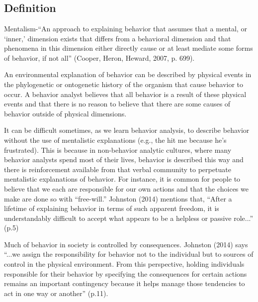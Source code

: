 \clearpage \section[\fourFKSeven{}]{\fourFKSeven{}%
              }
\subsection{Definition}
Mentalism-``An approach to explaining behavior that assumes that a mental, or ‘inner,' dimension exists that differs from a behavioral dimension and that phenomena in this dimension either directly cause or at least mediate some forms of behavior, if not all'' (Cooper, Heron, Heward, 2007, p. 699).

An environmental explanation of behavior can be described by physical events in the phylogenetic or ontogenetic history of the organism that cause behavior to occur. A behavior analyst believes that all behavior is a result of these physical events and that there is no reason to believe that there are some causes of behavior outside of physical dimensions.

It can be difficult sometimes, as we learn behavior analysis, to describe behavior without the use of mentalistic explanations (e.g., the hit me because he's frustrated). This is because in non-behavior analytic cultures, where many behavior analysts spend most of their lives, behavior is described this way and there is reinforcement available from that verbal community to perpetuate mentalistic explanations of behavior. For instance, it is common for people to believe that we each are responsible for our own actions and that the choices we make are done so with ``free-will.''  Johnston (2014) mentions that, ``After a lifetime of explaining behavior in terms of such apparent freedom, it is understandably difficult to accept what appears to be a helpless or passive role...'' (p.5) 

Much of behavior in society is controlled by consequences. Johnston (2014) says ``...we assign the responsibility for behavior not to the individual but to sources of control in the physical environment. From this perspective, holding individuals responsible for their behavior by specifying the consequences for certain actions remains an important contingency because it helps manage those tendencies to act in one way or another'' (p.11).
%
%
%
%
